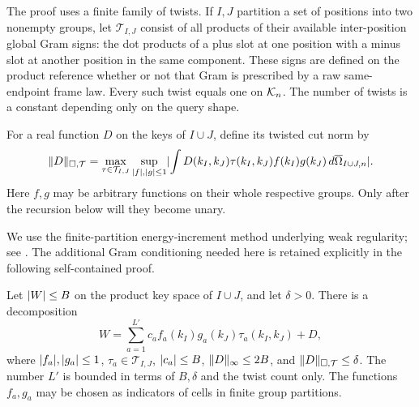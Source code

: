 The proof uses a finite family of twists. If $I,J$ partition a set of
positions into two nonempty groups, let $\mathcal T_{I,J}$ consist of
all products of their available inter-position global Gram signs:
the dot products of a plus slot at one position with a minus slot at
another position in the same component. These signs are defined on
the product reference whether or not that Gram is prescribed by a
raw same-endpoint frame law. Every such twist equals one on
$\mathcal K_n$. The number of twists is a constant depending only on the
query shape.

For a real function $D$ on the keys of $I\cup J$, define its twisted
cut norm by
\begin{equation}\label{eq:twisted-cut-norm}
 \lVert D\rVert_{\square,\mathcal T}
 =\max_{\tau\in\mathcal T_{I,J}}
   \sup_{\lvert f\rvert,\lvert g\rvert\le1}
   \lvert \int D(k_I,k_J)\tau(k_I,k_J)f(k_I)g(k_J)
                  \,d\overline\Omega_{I\cup J,n}\rvert.
\end{equation}
Here $f,g$ may be arbitrary functions on their whole respective
groups. Only after the recursion below will they become unary.

We use the finite-partition energy-increment method underlying weak
regularity; see \citet{frieze1999}. The additional Gram conditioning
needed here is retained explicitly in the following self-contained proof.

\begin{lemma}
\label{lem:product-twisted-regularity}
Let $\lvert W\rvert\le B$ on the product key space of $I\cup J$, and let
$\delta>0$. There is a decomposition
\begin{equation}\label{eq:twisted-regularity-decomposition}
 W=\sum_{a=1}^{L'}c_a f_a(k_I)g_a(k_J)\tau_a(k_I,k_J)+D,
\end{equation}
where $\lvert f_a\rvert,\lvert g_a\rvert\le1$, $\tau_a\in\mathcal T_{I,J}$,
$\lvert c_a\rvert\le B$, $\lVert D\rVert_\infty\le2B$, and
$\lVert D\rVert_{\square,\mathcal T}\le\delta$. The number $L'$ is bounded
in terms of $B,\delta$ and the twist count only. The functions $f_a,g_a$
may be chosen as indicators of cells in finite group partitions.
\end{lemma}

